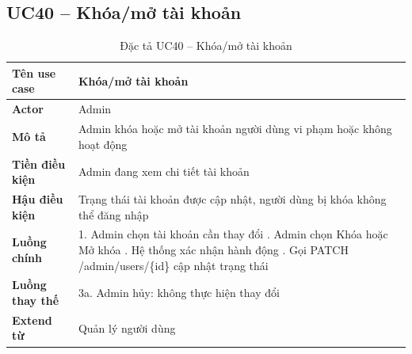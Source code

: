 \subsection*{UC40 -- Khóa/mở tài khoản}
\begin{table}[H]
    \captionsetup{justification=raggedright, singlelinecheck=false}
    \caption{Đặc tả UC40 -- Khóa/mở tài khoản}
\centering
\begin{tabular}{|p{3.5cm}|p{10cm}|}
\hline
\textbf{Tên use case} & Khóa/mở tài khoản \\
\hline
\textbf{Actor} & Admin \\
\hline
\textbf{Mô tả} & Admin khóa hoặc mở tài khoản người dùng
  vi phạm hoặc không hoạt động \\
\hline
\textbf{Tiền điều kiện} & Admin đang xem chi tiết tài khoản \\
\hline
\textbf{Hậu điều kiện} & Trạng thái tài khoản được cập nhật,
  người dùng bị khóa không thể đăng nhập \\
\hline
\textbf{Luồng chính} &
  1. Admin chọn tài khoản cần thay đổi \newline
  2. Admin chọn Khóa hoặc Mở khóa \newline
  3. Hệ thống xác nhận hành động \newline
  4. Gọi PATCH /admin/users/\{id\} cập nhật trạng thái \\
\hline
\textbf{Luồng thay thế} &
  3a. Admin hủy: không thực hiện thay đổi \\
\hline
\textbf{Extend từ} & Quản lý người dùng \\
\hline
\end{tabular}

\end{table}

